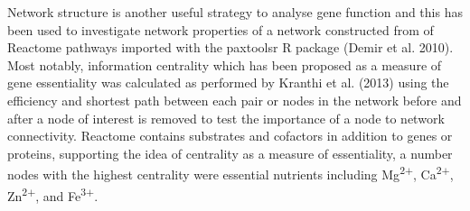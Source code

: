 
Network structure is another useful strategy to analyse gene function and this has been used to investigate network properties of a network constructed from of Reactome pathways imported with the paxtoolsr R package (Demir et al. 2010). Most notably, information centrality which has been proposed as a measure of gene essentiality was calculated as performed by Kranthi et al. (2013) using the efficiency and shortest path between each pair or nodes in the network before and after a node of interest is removed to test the importance of a node to network connectivity. Reactome contains substrates and cofactors in addition to genes or proteins, supporting the idea of centrality as a measure of essentiality, a number nodes with the highest centrality were essential nutrients including Mg\textsuperscript{2$+$}, Ca\textsuperscript{2$+$}, Zn\textsuperscript{2$+$},  and Fe\textsuperscript{3$+$}.